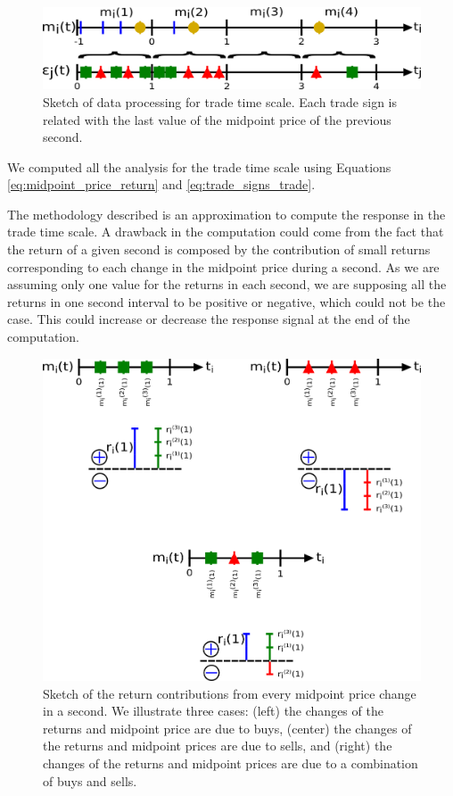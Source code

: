 \begin{figure}[htbp]
    \centering
    \includegraphics[width=\columnwidth]{figures/02_relation_trades_quotes_trade_scale.png}
    \caption{Sketch of data processing for trade time scale. Each trade sign is
             related with the last value of the midpoint price of the previous
             second.}
    \label{fig:relation_trades_midpoint_trade_scale}
\end{figure}

We computed all the analysis for the trade time scale using Equations
\ref{eq:midpoint_price_return} and \ref{eq:trade_signs_trade}.

The methodology described is an approximation to compute the response in the
trade time scale. A drawback in the computation could come from the fact that
the return of a given second is composed by the contribution of small returns
corresponding to each change in the midpoint price during a second. As we are
assuming only one value for the returns in each second, we are supposing  all
the returns in one second interval to be positive or negative, which could not
be the case. This could increase or decrease the response signal at the end of
the computation.

\begin{figure}[htbp]
    \centering
    \includegraphics[width=\columnwidth]{figures/02_return_contributions.png}
    \caption{Sketch of the return contributions from every midpoint price
             change in a second. We illustrate three cases: (left) the changes
             of the returns and midpoint price are due to buys, (center) the
             changes of the returns and midpoint prices are due to sells, and
             (right) the changes of the returns and midpoint prices are due to
             a combination of buys and sells.}
    \label{fig:return_contributions}
\end{figure}

